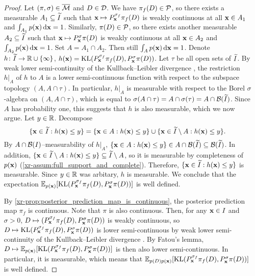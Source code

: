 \documentclass[12pt, twoside]{report}
\newcommand{\xrprefix}[1]{xr-#1}
\begin{document}
\begin{proof}
    Let $(\pi, \sigma) \in \overline{\mathcal{M}}$ and
    $D \in \mathcal{D}$.
    We have $\pi_f(D) \in \mathcal{P}$, so there exists a measurable $A_1 \subseteq \widetilde{I}$ such that $\mathbf{x} \mapsto P_{\mathbf{x}}^{\sigma_f} \pi_f(D)$ is weakly continuous at all $\mathbf{x} \in A_1$ and $\int_{A_1} p(\mathbf{x}) \, \mathrm{d} \mathbf{x} = 1$.
    Similarly, $\pi(D) \in \mathcal{P}$, so there exists another measurable $A_2 \subseteq \widetilde{I}$ such that $\mathbf{x} \mapsto P_{\mathbf{x}}^{\sigma} \pi(D)$ is weakly continuous at all $\mathbf{x} \in A_2$ and $\int_{A_2} p(\mathbf{x}) \, \mathrm{d} \mathbf{x} = 1$.
    Set $A = A_1 \cap A_2$.
    Then still $\int_A p(\mathbf{x}) \, \mathrm{d} \mathbf{x} = 1$.
    Denote $h\colon \widetilde{I} \to \mathbb{R} \cup \{\infty\}$, $h(\mathbf{x}) =\operatorname{KL}(P_{\mathbf{x}}^{\sigma_f} \pi_f(D), P_{\mathbf{x}}^{\sigma} \pi(D))$.
    Let $\tau$ be all open sets of $\widetilde{I}$.
    By weak lower semi-continuity of the Kullback--Leibler divergence \parencite{Posner:1975:Random_Coding_Strategies_for_Minimum}, the restriction $h|_A$ of $h$ to $A$ is a lower semi-continuous function with respect to the subspace topology $(A, A \cap \tau)$.
    In particular, $h|_A$ is measurable with respect to the Borel $\sigma$-algebra on $(A, A \cap \tau)$, which is equal to $\sigma(A \cap \tau) = A \cap \sigma(\tau) = A \cap \mathcal{B}(\widetilde{I})$.
    Since $A$ has probability one, this suggests that $h$ is also measurable, which we now argue.
    Let $y \in \mathbb{R}$.
    Decompose
    \begin{equation}
        \{\mathbf{x} \in \widetilde{I} : h(\mathbf{x}) \le y\}
        =
            \{\mathbf{x} \in A : h(\mathbf{x}) \le y\}
            \cup \{\mathbf{x} \in \widetilde{I} \setminus A : h(\mathbf{x}) \le y\}.
    \end{equation}
    By $A \cap \mathcal{B}(I)$--measurability of $h|_A$, $\{\mathbf{x} \in A : h(\mathbf{x}) \le y\} \in A \cap \mathcal{B}(\widetilde{I}) \subseteq \mathcal{B}(\widetilde{I})$.
    In addition, $\{\mathbf{x} \in \widetilde{I} \setminus A : h(\mathbf{x}) \le y\} \subseteq \widetilde{I} \setminus A$, so it is measurable by completeness of $p(\mathbf{x})$ (\cref{\xrprefix{assum:full_support_and_complete}}).
    Therefore, $\{\mathbf{x} \in \widetilde{I} : h(\mathbf{x}) \le y\}$ is measurable.
    Since $y \in \mathbb{R}$ was arbitary, $h$ is measurable.
    We conclude that the expectation $\mathbb{E}_{p(\mathbf{x})}[\operatorname{KL}(P_{\mathbf{x}}^{\sigma_f} \pi_f(D), P_{\mathbf{x}}^{\sigma} \pi(D))]$ is well defined.

    By \cref{\xrprefix{prop:posterior_prediction_map_is_continuous}}, the posterior prediction map $\pi_f$ is continuous.
    Note that $\pi$ is also continuous.
    Then, for any $\mathbf{x} \in I$ and $\sigma > 0$, $D \mapsto (P_{\mathbf{x}}^{\sigma_f} \pi_f(D), P_{\mathbf{x}}^{\sigma} \pi(D))$ is weakly continuous, so $D \mapsto \operatorname{KL}(P_{\mathbf{x}}^{\sigma_f} \pi_f(D), P_{\mathbf{x}}^{\sigma} \pi(D))$ is lower semi-continuous by weak lower semi-continuity of the Kullback--Leibler divergence \parencite{Posner:1975:Random_Coding_Strategies_for_Minimum}.
    By Fatou's lemma, $D \mapsto \mathbb{E}_{p(\mathbf{x})}[\operatorname{KL}(P_{\mathbf{x}}^{\sigma_f} \pi_f(D), P_{\mathbf{x}}^{\sigma} \pi(D))]$ is then also lower semi-continuous.
    In particular, it is measurable, which means that $\mathbb{E}_{p(D)p(\mathbf{x})}[\operatorname{KL}(P_{\mathbf{x}}^{\sigma_f} \pi_f(D), P_{\mathbf{x}}^{\sigma} \pi(D))]$
    is well defined.
\end{proof}
\end{document}

